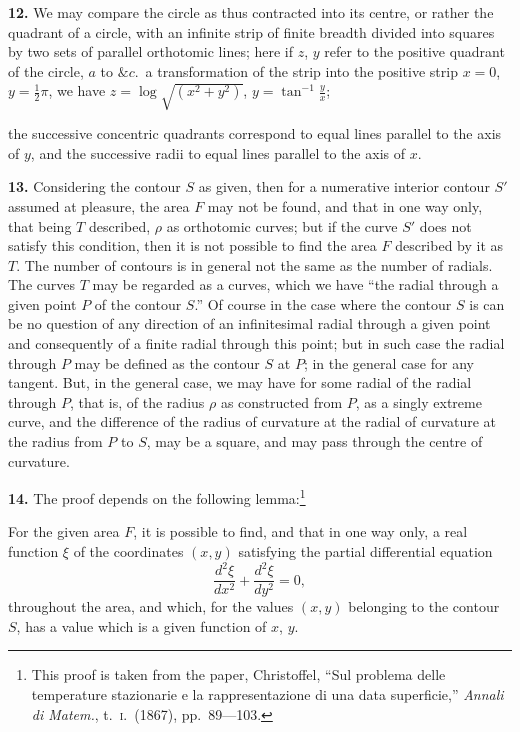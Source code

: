 \documentclass[11pt,a4paper]{book}
\begin{document}
\textbf{12.} We may compare the circle as thus contracted into its centre, or rather the quadrant of a circle, with an infinite strip of finite breadth divided into squares by two sets of parallel orthotomic lines; here if $z$, $y$ refer to the positive quadrant of the circle, $a$ to $\&c$.\ a transformation of the strip into the positive strip $x = 0$, $y = \frac{1}{2}\pi$, we have $z = \log\sqrt{(x^2 + y^2)}$, $y = \tan^{-1}\frac{y}{x}$;

the successive concentric quadrants correspond to equal lines parallel to the axis of $y$, and the successive radii to equal lines parallel to the axis of $x$.

\textbf{13.} Considering the contour $S$ as given, then for a numerative interior contour $S'$ assumed at pleasure, the area $F$ may not be found, and that in one way only, that being $T$ described, $\rho$ as orthotomic curves; but if the curve $S'$ does not satisfy this condition, then it is not possible to find the area $F$ described by it as $T$. The number of contours is in general not the same as the number of radials. The curves $T$ may be regarded as a curves, which we have ``the radial through a given point $P$ of the contour $S$.'' Of course in the case where the contour $S$ is can be no question of any direction of an infinitesimal radial through a given point and consequently of a finite radial through this point; but in such case the radial through $P$ may be defined as the contour $S$ at $P$; in the general case for any tangent. But, in the general case, we may have for some radial of the radial through $P$, that is, of the radius $\rho$ as constructed from $P$, as a singly extreme curve, and the difference of the radius of curvature at the radial of curvature at the radius from $P$ to $S$, may be a square, and may pass through the centre of curvature.

\textbf{14.} The proof depends on the following lemma:\footnote{This proof is taken from the paper, Christoffel, ``Sul problema delle temperature stazionarie e la rappresentazione di una data superficie,'' \textit{Annali di Matem.}, t.\ \textsc{i}.\ (1867), pp.\ 89---103.}

For the given area $F$, it is possible to find, and that in one way only, a real function $\xi$ of the coordinates $(x, y)$ satisfying the partial differential equation
\[
\frac{d^2 \xi}{d x^2} + \frac{d^2 \xi}{d y^2} = 0,
\]
throughout the area, and which, for the values $(x, y)$ belonging to the contour $S$, has a value which is a given function of $x$, $y$.
\end{document}
